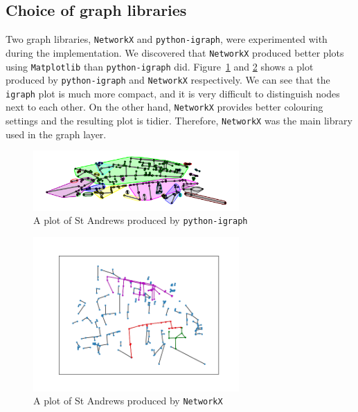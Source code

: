 \documentclass[12pt,a4paper]{report}
\begin{document}
\subsection{Choice of graph libraries}
Two graph libraries, \texttt{NetworkX} and \texttt{python-igraph}, were experimented with during the implementation. We discovered that \texttt{NetworkX} produced better plots using \texttt{Matplotlib} than \texttt{python-igraph} did. Figure~\ref{fig:igraph} and \ref{fig:networkx} shows a plot produced by \texttt{python-igraph} and \texttt{NetworkX} respectively. We can see that the \texttt{igraph} plot is much more compact, and it is very difficult to distinguish nodes next to each other. On the other hand, \texttt{NetworkX} provides better colouring settings and the resulting plot is tidier. Therefore, \texttt{NetworkX} was the main library used in the graph layer.

\begin{figure}[ht]
    \centering
    \includegraphics[width=0.7\textwidth]{diss_images/impl/igraph.png}
    \caption{A plot of St Andrews produced by \texttt{python-igraph}}
    \label{fig:igraph}
\end{figure}

\begin{figure}[ht]
    \centering
    \includegraphics[width=0.7\textwidth,trim={2.5cm 1.5cm 1.7cm 1.7cm},clip]{diss_images/impl/networkx.png}
    \caption{A plot of St Andrews produced by \texttt{NetworkX}}
    \label{fig:networkx}
\end{figure}
\end{document}
